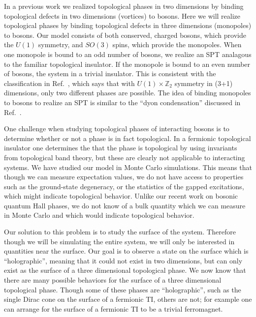 \documentclass[prb,twocolumn]{revtex4}
\begin{document}
In a previous work\cite{FQHE} we realized topological phases in two dimensions by binding topological defects in two dimensions (vortices) to bosons. Here we will realize topological phases by binding topological defects in three dimensions (monopoles) to bosons. Our model consists of both conserved, charged bosons, which provide the $U(1)$ symmetry, and $SO(3)$ spins, which provide the monopoles. When one monopole is bound to an odd number of bosons, we realize an SPT analagous to the familiar topological insulator. If the monopole is bound to an even number of bosons, the system in a trivial insulator. This is consistent with the classification in Ref.~, which says that with $U(1)\times \mathbb{Z}_2$ symmetry in (3+1) dimensions, only two different phases are possible. The idea of binding monopoles to bosons to realize an SPT is similar to the ``dyon condensation'' discussed in Ref.~.


One challenge when studying topological phases of interacting bosons is to determine whether or not a phase is in fact topological. In a fermionic topological insulator one determines the that the phase is topological by using invariants from topological band theory, but these are clearly not applicable to interacting systems. We have studied our model in Monte Carlo simulations. This means that though we can measure expectation values, we do not have access to properties such as the ground-state degeneracy, or the statistics of the gapped excitations, which might indicate topological behavior. Unlike our recent work on bosonic quantum Hall phases\cite{FQHE}, we do not know of a bulk quantity which we can measure in Monte Carlo and which would indicate topological behavior.

Our solution to this problem is to study the surface of the system. Therefore though we will be simulating the entire system, we will only be interested in quantities near the surface. Our goal is to observe a state on the surface which is ``holographic'', meaning that it could not exist in two dimensions, but can only exist as the surface of a three dimensional topological phase. We now know that there are many possible behaviors for the surface of a three dimensional topological phase. Though some of these phases are ``holographic'', such as the single Dirac cone on the surface of a fermionic TI, others are not; for example one can arrange for the surface of a fermionic TI to be a trivial ferromagnet. 
\end{document}
